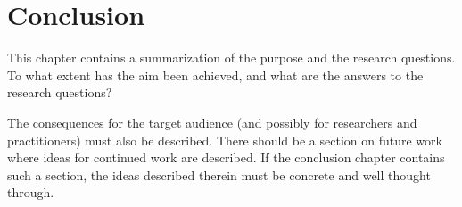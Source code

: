\chapter{Conclusion}
\label{cha:conclusion}

This chapter contains a summarization of the purpose and the research
questions. To what extent has the aim been achieved, and what are the
answers to the research questions?

The consequences for the target audience (and possibly for researchers
and practitioners) must also be described. There should be a section
on future work where ideas for continued work are described. If the
conclusion chapter contains such a section, the ideas described
therein must be concrete and well thought through.
